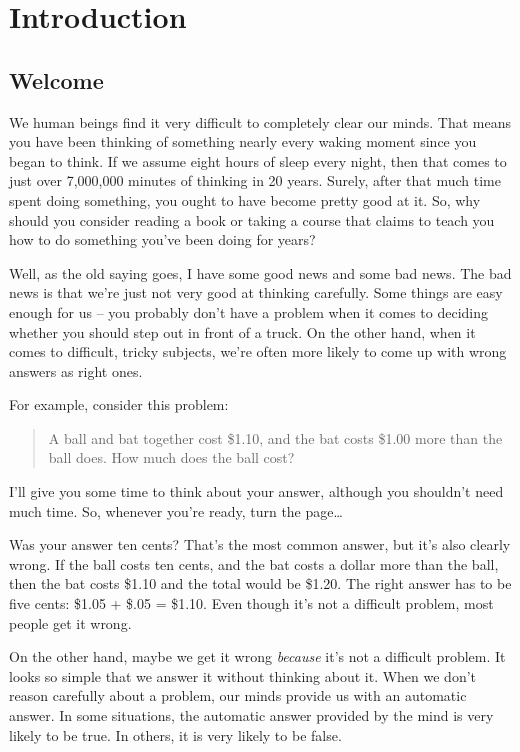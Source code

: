
\chapter{Introduction}
\label{chap:intro}

\section{Welcome}
\label{sec:welcome}

We human beings find it very difficult to completely clear our minds. That means you have been thinking of something nearly every waking moment since you began to think. If we assume eight hours of sleep every night, then that comes to just over 7,000,000 minutes of thinking in 20 years. Surely, after that much time spent doing something, you ought to have become pretty good at it. So, why should you consider reading a book or taking a course that claims to teach you how to do something you've been doing for years?

Well, as the old saying goes, I have some good news and some bad news. The bad news is that we're just not very good at thinking carefully. Some things are easy enough for us -- you probably don't have a problem when it comes to deciding whether you should step out in front of a truck. On the other hand, when it comes to difficult, tricky subjects, we're often more likely to come up with wrong answers as right ones.

For example, consider this problem:

\begin{quote}
A ball and bat together cost \$1.10, and the bat costs \$1.00 more than the ball does. How much does the ball cost?
\end{quote}

I'll give you some time to think about your answer, although you shouldn't need much time. So, whenever you're ready, turn the page\ldots

\newpage

Was your answer ten cents? That's the most common answer, but it's also clearly wrong. If the ball costs ten cents, and the bat costs a dollar more than the ball, then the bat costs \$1.10 and the total would be \$1.20. The right answer has to be five cents: \$1.05 + \$.05 = \$1.10. Even though it's not a difficult problem, most people get it wrong.

On the other hand, maybe we get it wrong \emph{because} it's not a difficult
problem. It looks so simple that we answer it without thinking about it.
When we don't reason carefully about a problem, our minds provide us
with an automatic answer. In some situations, the automatic answer
provided by the mind is very likely to be true. In others, it is very
likely to be false.

